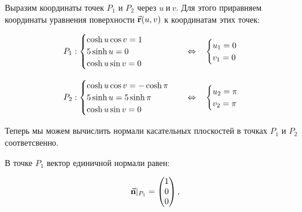 \documentclass[12pt,a4paper]{article}
\begin{document}
    Выразим координаты точек $ P_1 $ и $ P_2 $ через $ u \ \text{и} \ v $. Для этого приравняем координаты уравнения поверхности $ \vec{\textbf r}(u, v) $ к координатам этих точек:

    \[
        \begin{tabular}{lcl}
            $
                P_1: 
                \begin{cases}
                    \cosh u \cos v = 1
                    \\
                    5 \sinh u = 0
                    \\
                    \cosh u \sin v = 0
                \end{cases} 
            $ 
            & $ \Leftrightarrow $ & 
            $
                \begin{cases}
                    u_1 = 0
                    \\
                    v_1 = 0
                \end{cases}
            $

            \\ \\

            $
                P_2: 
                \begin{cases}
                    \cosh u \cos v = -\cosh \pi
                    \\
                    5 \sinh u =  5 \sinh \pi
                    \\
                    \cosh u \sin v = 0
                \end{cases}
            $ 
            & $ \Leftrightarrow $ & 
            $
                \begin{cases}
                    u_2 = \pi
                    \\
                    v_2 = \pi
                \end{cases}
            $

        \end{tabular}
    \]

    Теперь мы можем вычислить нормали касательных плоскостей в точках $ P_1 $ и $ P_2 $ соответсвенно. 
    
    В точке $ {P_1} $ вектор единичной нормали равен:

    \[
        \vec{\textbf n}|_{P_1} =
        \begin{pmatrix}
            1 
            \\ 
            0 
            \\ 
            0  
        \end{pmatrix},
    \]
\end{document}
